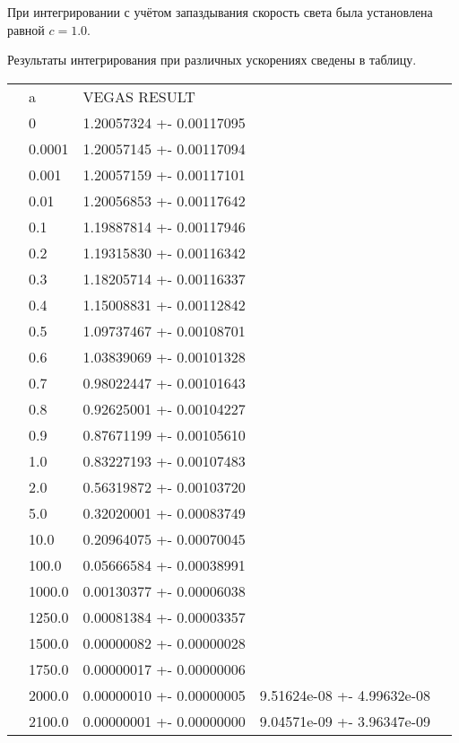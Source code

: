 \documentclass{article}
\begin{document}
При интегрировании с учётом запаздывания скорость света была установлена равной $c = 1.0$.

Результаты интегрирования при различных ускорениях сведены в таблицу.

\begin{table}[]
\begin{tabular}{lllll}
 & a      & VEGAS RESULT             &  &  \\
 & 0      & 1.20057324 +- 0.00117095 &  &  \\
 & 0.0001 & 1.20057145 +- 0.00117094 &  &  \\
 & 0.001  & 1.20057159 +- 0.00117101 &  &  \\
 & 0.01   & 1.20056853 +- 0.00117642 &  &  \\
 & 0.1    & 1.19887814 +- 0.00117946 &  &  \\
 & 0.2    & 1.19315830 +- 0.00116342 &  &  \\
 & 0.3    & 1.18205714 +- 0.00116337 &  &  \\
 & 0.4    & 1.15008831 +- 0.00112842 &  &  \\
 & 0.5    & 1.09737467 +- 0.00108701 &  &  \\
 & 0.6    & 1.03839069 +- 0.00101328 &  &  \\
 & 0.7    & 0.98022447 +- 0.00101643 &  &  \\
 & 0.8    & 0.92625001 +- 0.00104227 &  &  \\
 & 0.9    & 0.87671199 +- 0.00105610 &  &  \\
 & 1.0    & 0.83227193 +- 0.00107483 &  &  \\
 & 2.0    & 0.56319872 +- 0.00103720 &  &  \\
 & 5.0    & 0.32020001 +- 0.00083749 &  &  \\
 & 10.0   & 0.20964075 +- 0.00070045 &  &  \\
 & 100.0  & 0.05666584 +- 0.00038991 &  &  \\
 & 1000.0 & 0.00130377 +- 0.00006038 &  &  \\
 & 1250.0 & 0.00081384 +- 0.00003357 &  &  \\
 & 1500.0 & 0.00000082 +- 0.00000028 &  &  \\
 & 1750.0 & 0.00000017 +- 0.00000006 &  &  \\
 & 2000.0 & 0.00000010 +- 0.00000005 & 9.51624e-08 +- 4.99632e-08 &  \\
 & 2100.0 & 0.00000001 +- 0.00000000 & 9.04571e-09 +- 3.96347e-09 &  \\
\end{tabular}
\end{table}
\end{document}
